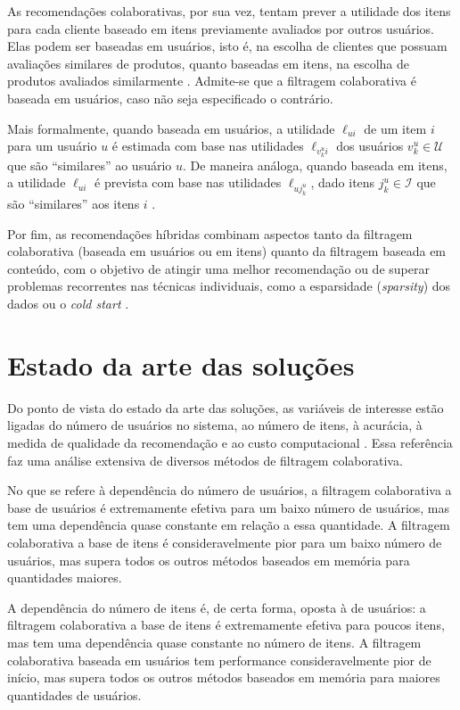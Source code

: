 As recomendações colaborativas, por sua vez, tentam prever a utilidade dos itens para cada cliente baseado em itens previamente avaliados por outros usuários. Elas podem ser baseadas em usuários, isto é, na escolha de clientes  que possuam avaliações similares de produtos, quanto baseadas em itens, na escolha de produtos avaliados similarmente \cite{linden2003amazon}. Admite-se que a filtragem colaborativa é baseada em usuários, caso não seja especificado o contrário.  

Mais formalmente, quando baseada em usuários, a utilidade $\ell_{ui}$ de um item $i$ para um usuário $u$ é estimada com base nas utilidades $\ell_{v_k^u i}$ dos usuários $v_k^u \in \mathcal{U}$ que são ``similares'' ao usuário $u$.  De maneira análoga, quando baseada em itens, a utilidade $\ell_{ui}$ é prevista com base nas utilidades $\ell_{u j_k^u}$, dado itens $j_k^u \in \mathcal{I}$ que são ``similares'' aos itens $i$ .

Por fim, as recomendações híbridas combinam aspectos tanto da filtragem colaborativa (baseada em usuários ou em itens) quanto da filtragem baseada em conteúdo, com o objetivo de atingir uma melhor recomendação ou de superar problemas recorrentes nas técnicas individuais, como a esparsidade (\textit{sparsity}) dos dados ou o \textit{cold start} \cite{burke2007hybrid}.

\section{Estado da arte das soluções} %
\label{sec:estado_da_arte_das_solu_es}

Do ponto de vista do estado da arte das soluções, as variáveis de interesse estão ligadas do número de usuários no sistema, ao número de itens, à acurácia, à medida de qualidade da recomendação e ao custo computacional \cite{lee2012comparative}. Essa referência faz uma análise extensiva de diversos métodos de filtragem colaborativa.

No que se refere à dependência do número de usuários, a filtragem colaborativa a base de usuários é extremamente efetiva para um baixo número de usuários, mas tem uma dependência quase constante em relação a essa quantidade. A filtragem colaborativa a base de itens é consideravelmente pior para um baixo número de usuários, mas supera todos os outros métodos baseados em memória para quantidades maiores.

A dependência do número de itens é, de certa forma, oposta à de usuários: a filtragem colaborativa a base de itens é extremamente efetiva para poucos itens, mas tem uma dependência quase constante no número de itens. A filtragem colaborativa baseada em usuários tem performance consideravelmente pior de início, mas supera todos os outros métodos baseados em memória para maiores quantidades de usuários.

